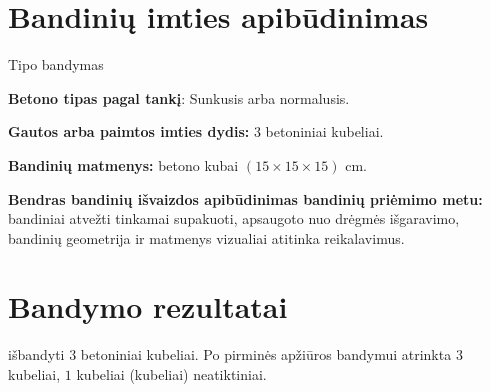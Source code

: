 \documentclass[a4paper, 12pt]{article}
\begin{document}
\section{Bandinių imties apibūdinimas}

\hspace{\parindent}{\bf Bandymo tipas pagal LST EN 206-1 8.2.1.2 ir/arba 8.2.1.3 pastraipas:} {Tipo bandymas }

{\bf Betono tipas pagal tankį}: {Sunkusis arba normalusis}.%

{\bf Gautos arba paimtos imties dydis:} $ 3 $ betoniniai kubeliai. 
	
	{\bf Bandinių matmenys:} betono kubai { $ (15 \times 15 \times 15) $} cm.
	
	{\bf Bendras bandinių išvaizdos apibūdinimas bandinių priėmimo metu:} bandiniai atvežti tinkamai supakuoti, apsaugoto nuo drėgmės išgaravimo, bandinių geometrija ir matmenys vizualiai atitinka reikalavimus. %


\section{Bandymo rezultatai}

\hspace{\parindent}{\bf Imties dydis:} išbandyti $ 3 $ betoniniai kubeliai.
Po pirminės apžiūros bandymui atrinkta $ 3 $ kubeliai,
$ 1 $ kubeliai (kubeliai) neatiktiniai. %
\end{document}
